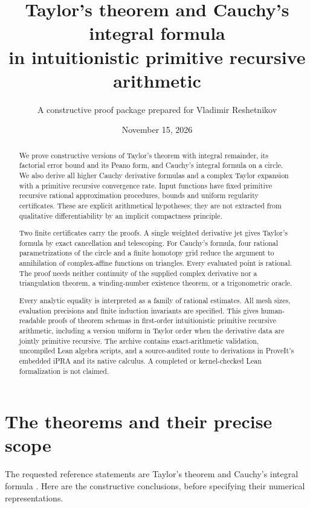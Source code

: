 \documentclass[11pt]{article}
\title{Taylor's theorem and Cauchy's integral formula\\
in intuitionistic primitive recursive arithmetic}
\author{A constructive proof package prepared for Vladimir Reshetnikov}
\date{November 15, 2026}
\theoremstyle{definition}
\begin{document}
\maketitle
\begin{abstract}
We prove constructive versions of Taylor's theorem with integral remainder,
its factorial error bound and its Peano form, and Cauchy's integral formula
on a circle. We also derive all higher Cauchy derivative formulas and a
complex Taylor expansion with a primitive recursive convergence rate.
Input functions have fixed primitive recursive rational approximation
procedures, bounds and uniform regularity certificates. These are explicit
arithmetical hypotheses; they are not extracted from qualitative
differentiability by an implicit compactness principle.

Two finite certificates carry the proofs. A single weighted derivative jet
gives Taylor's formula by exact cancellation and telescoping. For Cauchy's
formula, four rational parametrizations of the circle and a finite homotopy
grid reduce the argument to annihilation of complex-affine functions on
triangles. Every evaluated point is rational. The proof needs neither
continuity of the supplied complex derivative nor a triangulation theorem,
a winding-number existence theorem, or a trigonometric oracle.

Every analytic equality is interpreted as a family of rational estimates.
All mesh sizes, evaluation precisions and finite induction invariants are
specified. This gives human-readable proofs of theorem schemas in
first-order intuitionistic primitive recursive arithmetic, including a
version uniform in Taylor order when the derivative data are jointly
primitive recursive. The archive contains exact-arithmetic validation,
uncompiled Lean algebra scripts, and a source-audited route to derivations
in ProveIt's embedded iPRA and its native calculus. A completed or
kernel-checked Lean formalization is not claimed.
\end{abstract}
\newpage
\begingroup\small\tableofcontents\endgroup
\newpage

\section{The theorems and their precise scope}\label{sec:scope}

The requested reference statements are Taylor's theorem and Cauchy's
integral formula \cite{wikitaylor,wikicauchy}. Here are the constructive
conclusions, before specifying their numerical representations.
\end{document}
